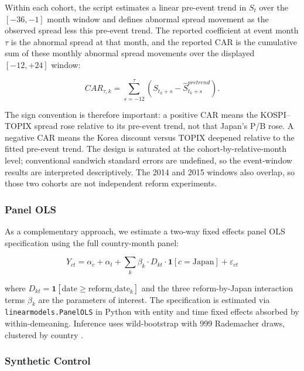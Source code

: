 \documentclass[12pt]{article}
\begin{document}
Within each cohort, the script estimates a linear pre-event trend in $S_t$ over the
$[-36,-1]$ month window and defines abnormal spread movement as the observed spread less this
pre-event trend. The reported coefficient at event month $\tau$ is the abnormal spread at
that month, and the reported CAR is the cumulative sum of these monthly abnormal spread
movements over the displayed $[-12,+24]$ window:

\begin{equation}
  CAR_{\tau,k} = \sum_{s=-12}^{\tau} \left(S_{t_k+s} - \widehat{S}_{t_k+s}^{pretrend}\right).
  \label{eq:event_car}
\end{equation}

The sign convention is therefore important: a positive CAR means the KOSPI--TOPIX spread rose
relative to its pre-event trend, not that Japan's P/B rose. A negative CAR means the Korea
discount versus TOPIX deepened relative to the fitted pre-event trend. The design is saturated
at the cohort-by-relative-month level; conventional sandwich standard errors are undefined,
so the event-window results are interpreted descriptively. The 2014 and 2015 windows also
overlap, so those two cohorts are not independent reform experiments.

\subsubsection{Panel OLS}

As a complementary approach, we estimate a two-way fixed effects panel OLS specification
using the full country-month panel:

\begin{equation}
  Y_{ct} = \alpha_c + \alpha_t + \sum_{k} \beta_k \cdot D_{kt} \cdot \mathbf{1}[c = \text{Japan}] + \varepsilon_{ct}
  \label{eq:panel_ols}
\end{equation}

where $D_{kt} = \mathbf{1}[\text{date} \geq \text{reform\_date}_k]$ and the three
reform-by-Japan interaction terms $\beta_k$ are the parameters of interest. The specification
is estimated via \texttt{linearmodels.PanelOLS} in Python with entity and time fixed effects
absorbed by within-demeaning. Inference uses wild-bootstrap with 999 Rademacher draws,
clustered by country \citep{cameron2008}.

\subsubsection{Synthetic Control}
\end{document}
